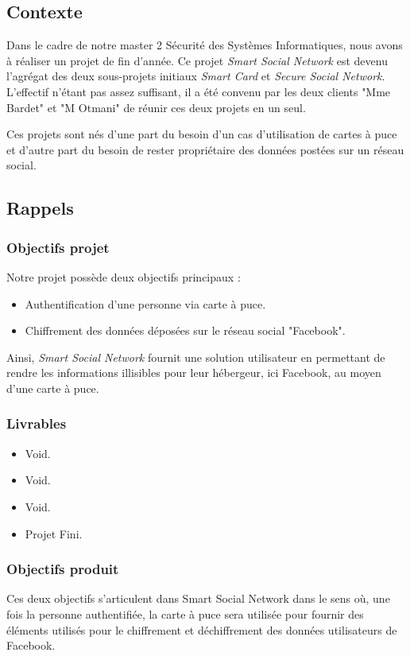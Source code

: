 \documentclass[a4paper,11pt,french]{article}
\begin{document}
\subsection{Contexte}
	Dans le cadre de notre master 2 Sécurité des Systèmes Informatiques,
nous avons à réaliser un projet de fin d'année. Ce projet \emph{Smart Social
Network} est devenu l'agrégat des deux sous-projets initiaux \emph{Smart
Card} et \emph{Secure Social Network}. L'effectif n'étant pas assez 
suffisant, il a été convenu par les deux clients "Mme Bardet" et "M Otmani"
de réunir ces deux projets en un seul.


	Ces projets sont nés d'une part du besoin d'un cas d'utilisation 
de cartes à puce et d'autre part du besoin de rester propriétaire des
données postées sur un réseau social.


\subsection{Rappels}
\subsubsection{Objectifs projet}
	Notre projet possède deux objectifs principaux :
\begin{itemize}
	\item Authentification d'une personne via carte à puce.
	\item Chiffrement des données déposées sur le réseau social
"Facebook".
\end{itemize}

	Ainsi, \emph{Smart Social Network} fournit une solution utilisateur
en permettant de rendre les informations illisibles pour leur hébergeur, ici
Facebook, au moyen d'une carte à puce.

\subsubsection{Livrables}
\begin{itemize}
	\item Void.
	\item Void.
	\item Void.
	\item Projet Fini.
\end{itemize}

\subsubsection{Objectifs produit}
	Ces deux objectifs s'articulent dans Smart Social Network dans le
sens où, une fois la personne authentifiée, la carte à puce sera utilisée
pour fournir des éléments utilisés pour le chiffrement et déchiffrement
des données utilisateurs de Facebook.
\end{document}
